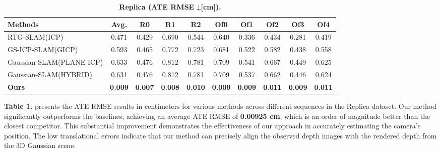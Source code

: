 \documentclass[twocolumn]{article} %
\begin{document}
\begin{table}[htbp]
\renewcommand{\thetable}{\textbf{\arabic{table}}}
\renewcommand{\tablename}{\textbf{Table}}
\centering
\caption{\textbf{Replica\cite{straubReplicaDatasetDigital2019} (ATE RMSE ↓[cm]).}}
\label{table:replica_ATE}
\begin{adjustbox}{max width=\columnwidth,max height=!,center}
\begin{tabular}{lccccccccc}
\toprule
\textbf{Methods} & \textbf{Avg.} & \textbf{R0} & \textbf{R1} & \textbf{R2} & \textbf{Of0} & \textbf{Of1} & \textbf{Of2} & \textbf{Of3} & \textbf{Of4}\\
\midrule
RTG-SLAM(ICP)\cite{pengRTGSLAMRealtime3D2024} & \cellcolor{yellow!30}0.471 & \cellcolor{yellow!30}0.429 & \cellcolor{yellow!30}0.690 & \cellcolor{yellow!30}0.544 & \cellcolor{yellow!30}0.640 & \cellcolor{yellow!30}0.336 & \cellcolor{yellow!30}0.434 & \cellcolor{yellow!30}0.281 & \cellcolor{yellow!30}0.419\\
GS-ICP-SLAM(GICP)\cite{haRGBDGSICPSLAM2024} & \cellcolor{lime!50}0.593 & \cellcolor{lime!50}0.465 & \cellcolor{lime!50}0.772 & \cellcolor{lime!50}0.723 & \cellcolor{lime!50}0.681 & \cellcolor{lime!50}0.522 & \cellcolor{lime!50}0.582 & \cellcolor{lime!50}0.438 & \cellcolor{lime!50}0.558\\
Gaussian-SLAM(PLANE ICP)\cite{yugayGaussianSLAMPhotorealisticDense2024} & 0.633 & 0.476 & 0.812 & 0.781 & 0.709 & 0.541 & 0.667 & 0.449 & 0.625\\
Gaussian-SLAM(HYBRID)\cite{yugayGaussianSLAMPhotorealisticDense2024} & 0.631 & 0.476 & 0.812 & 0.781 & 0.709 & 0.537 & 0.662 & 0.446 & 0.624\\
\midrule
\textbf{Ours} & \cellcolor{green!30}\textbf{0.009} & \cellcolor{green!30}\textbf{0.007} & \cellcolor{green!30}\textbf{0.008} & \cellcolor{green!30}\textbf{0.010} & \cellcolor{green!30}\textbf{0.009} & \cellcolor{green!30}\textbf{0.009} & \cellcolor{green!30}\textbf{0.011} & \cellcolor{green!30}\textbf{0.009} & \cellcolor{green!30}\textbf{0.011}\\
\bottomrule
\end{tabular}
\end{adjustbox}
\end{table}

\textbf{Table 1.} presents the ATE RMSE results in centimeters for
various methods across different sequences in the Replica dataset. Our
method significantly outperforms the baselines, achieving an average ATE
RMSE of \textbf{0.00925 cm}, which is an order of magnitude better than
the closest competitor. This substantial improvement demonstrates the
effectiveness of our approach in accurately estimating the camera's
position. The low translational errors indicate that our method can
precisely align the observed depth images with the rendered depth from
the 3D Gaussian scene.
\end{document}
